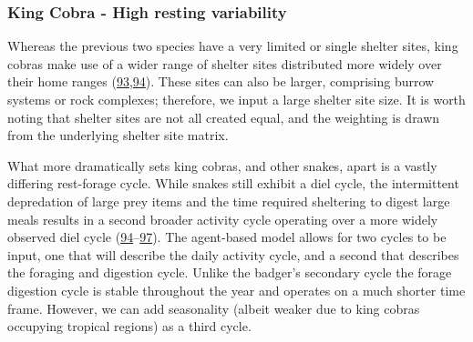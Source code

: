 \documentclass[10pt,a4paper]{article}
\newenvironment{Shaded}{}{}
\newcommand{\AttributeTok}[1]{#1}
\newcommand{\ConstantTok}[1]{#1}
\newcommand{\DecValTok}[1]{#1}
\newcommand{\FloatTok}[1]{#1}
\newcommand{\FunctionTok}[1]{#1}
\newcommand{\NormalTok}[1]{#1}
\newcommand{\OtherTok}[1]{#1}
\newcommand{\SpecialCharTok}[1]{#1}
\newcommand{\StringTok}[1]{#1}
\begin{document}
\hypertarget{king-cobra---high-resting-variability}{%
\subsubsection{King Cobra - High resting variability}\label{king-cobra---high-resting-variability}}

Whereas the previous two species have a very limited or single shelter sites, king cobras make use of a wider range of shelter sites distributed more widely over their home ranges (\protect\hyperlink{ref-Marshall2018}{93},\protect\hyperlink{ref-marshall_no_2020}{94}).
These sites can also be larger, comprising burrow systems or rock complexes; therefore, we input a large shelter site size.
It is worth noting that shelter sites are not all created equal, and the weighting is drawn from the underlying shelter site matrix.

\begin{Shaded}
\end{Shaded}

What more dramatically sets king cobras, and other snakes, apart is a vastly differing rest-forage cycle.
While snakes still exhibit a diel cycle, the intermittent depredation of large prey items and the time required sheltering to digest large meals results in a second broader activity cycle operating over a more widely observed diel cycle (\protect\hyperlink{ref-marshall_no_2020}{94}--\protect\hyperlink{ref-Siers2018}{97}).
The agent-based model allows for two cycles to be input, one that will describe the daily activity cycle, and a second that describes the foraging and digestion cycle.
Unlike the badger's secondary cycle the forage digestion cycle is stable throughout the year and operates on a much shorter time frame.
However, we can add seasonality (albeit weaker due to king cobras occupying tropical regions) as a third cycle.
\end{document}
